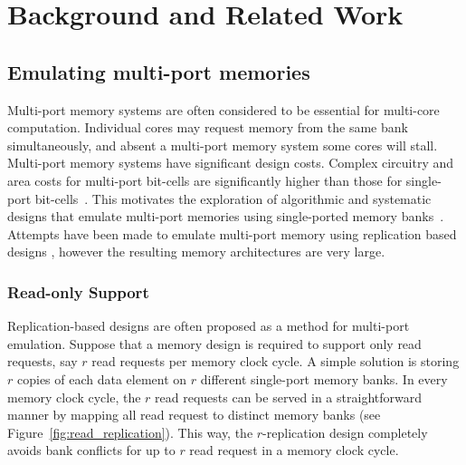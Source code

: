 \section{Background and Related Work}
\label{sec:bg}

\subsection{Emulating multi-port memories}
\label{sec:emulation}

Multi-port memory systems are often considered to be essential for multi-core computation. Individual cores may request memory from the same bank simultaneously, and absent a multi-port memory system some cores will stall. Multi-port memory systems have significant design costs. Complex circuitry and area costs for multi-port bit-cells are significantly higher than those for single-port bit-cells~\cite{Suzuki,WLCH14}. This motivates the exploration of algorithmic and systematic designs that emulate multi-port memories using single-ported memory banks~\cite{ACP88, EMY91, RG91,Memoir_xor, Memoir_xor_virtual}. Attempts have been made to emulate multi-port memory using replication based designs \cite{CCES93}, however the resulting memory architectures are very large.


\subsubsection{Read-only Support} 
\label{sec:read_only}
Replication-based designs are often proposed as a method for multi-port emulation. Suppose that a memory design is required to support only read requests, say $r$ read requests per memory clock cycle. A simple solution is storing $r$ copies of each data element on $r$ different single-port memory banks. In every memory clock cycle, the $r$ read requests can be served in a straightforward manner by mapping all read request to distinct memory banks (see Figure~\ref{fig:read_replication}). This way, the $r$-replication design completely avoids bank conflicts for up to $r$ read request in a memory clock cycle. 

